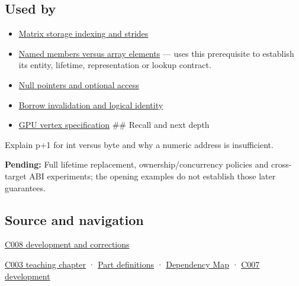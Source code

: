 \subsection{Used by}\label{appendix-6af5921bc853-used-by}

\begin{itemize}
\item
  \hyperref[appendix-ffdc1d4e5350]{Matrix storage indexing and strides}
\item
  \hyperref[appendix-3f7e15effba6]{Named members versus array elements} --- uses this prerequisite to establish its entity, lifetime, representation or lookup contract.
\item
  \hyperref[appendix-afae48c31800]{Null pointers and optional access}
\item
  \hyperref[appendix-f9b8b9188c7f]{Borrow invalidation and logical identity}
\item
  \hyperref[appendix-749ba51a6c25]{GPU vertex specification} \#\# Recall and next depth
\end{itemize}

Explain p+1 for int versus byte and why a numeric address is insufficient.

\textbf{Pending:} Full lifetime replacement, ownership/concurrency policies and cross-target ABI experiments; the opening examples do not establish those later guarantees.

\subsection{Source and navigation}\label{appendix-6af5921bc853-source-and-navigation}

\hyperref[appendix-fd090d982a15-m008---parts-113-126]{C008 development and corrections}

\hyperref[01-foundations-i-ch002-where-the-bytes-live]{C003 teaching chapter} · \hyperref[appendix-fd090d982a15-m003---parts-41-60]{Part definitions} · \hyperref[appendix-4ad47bdd269a]{Dependency Map} · \hyperref[01-foundations-i-ch003-bringing-the-object-model-back-to-bytes]{C007 development}

